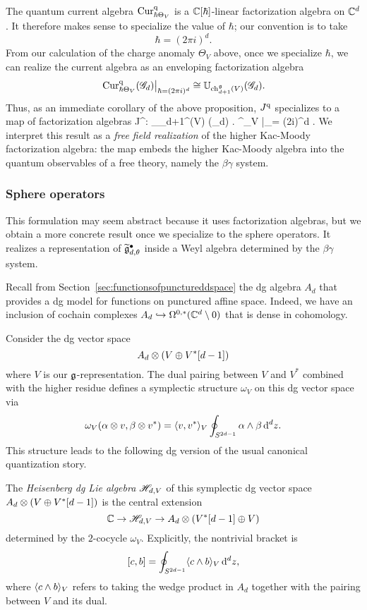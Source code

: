 The quantum current algebra ${\rm Cur}^{\rm q}_{\hbar \Theta_V}$ is a $\mathbb C[\hbar]$-linear factorization algebra on $\mathbb C^d$. 
It therefore makes sense to specialize the value of $\hbar$;
our convention is to take
\[
\hbar = (2 \pi i)^d .
\]
From our calculation of the charge anomaly $\Theta_V$ above, once we specialize $\hbar$, we can realize the current algebra as an enveloping factorization algebra
\[
\left. {\rm Cur}^{\rm q}_{\hbar \Theta_V} (\mathscr G_d) \right|_{\hbar = (2\pi i)^d} \cong \mathbb U_{{\rm ch}_{d+1}^\mathfrak g(V)} (\mathscr G_d) .
\]
Thus, as an immediate corollary of the above proposition, $J^{\rm q}$ specializes to a map of factorization algebras
\beqn\label{free field}
J^\q : \UU_{\ch_{d+1}^\fg(V)} (\sG_d) \to \left. \Obs^\q_V \right|_{\hbar = (2\pi i)^d} .
\eeqn
We interpret this result as a {\em free field realization} of the higher Kac-Moody factorization algebra: 
the map embeds the higher Kac-Moody algebra into the quantum observables of a free theory, namely the $\beta\gamma$ system. 

\subsubsection{Sphere operators}

This formulation may seem abstract because it uses factorization algebras,
but we obtain a more concrete result once we specialize to the sphere operators. 
It realizes a representation of $\widetilde{\mathfrak g}^\bullet_{d,\theta}$ inside a Weyl algebra determined by  the $\beta\gamma$ system.

Recall from Section~\ref{sec:functionsofpunctureddspace} the dg algebra $A_d$ that provides a dg model for functions on punctured affine space.
Indeed, we have an inclusion of cochain complexes $A_d \hookrightarrow \Omega^{0,*}(\mathbb C^d \setminus 0)$ that is dense in cohomology.

Consider the dg vector space
\[
A_d \otimes (V \oplus V^*[d-1])
\]
where $V$ is our $\mathfrak g$-representation. 
The dual pairing between $V$ and $V^*$ combined with the higher residue defines a symplectic structure $\omega_V$ on this dg vector space via
\[
\omega_V(\alpha \otimes v, \beta \otimes v^*) = \langle v, v^*\rangle_V \oint_{S^{2d-1}} \alpha \wedge \beta\, {\rm d}^d z .
\]
This structure leads to the following dg version of the usual canonical quantization story.

\begin{dfn}
The {\em Heisenberg dg Lie algebra} $\mathscr H_{d,V}$ of this symplectic dg vector space $A_d \otimes (V \oplus V^*[d-1])$ is the central extension
\[
\mathbb C \to \mathscr H_{d,V} \to A_d \otimes (V^*[d-1] \oplus V) 
\]
determined by the $2$-cocycle $\omega_V$. 
Explicitly, the nontrivial bracket is
\[
[c, b] =  \oint_{S^{2d-1}} \langle c \wedge b\rangle_V\, {\rm d}^d z,
\]
where $\langle c \wedge b\rangle_V$ refers to taking the wedge product in $A_d$ together with the pairing between $V$ and its dual. 
\end{dfn}

